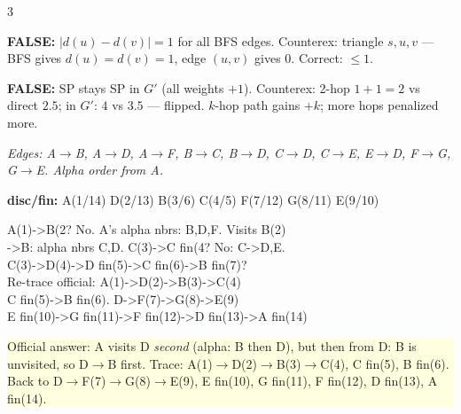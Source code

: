 \documentclass[9pt]{extarticle}
\newcommand{\yb}[1]{\vspace{1pt}\noindent\colorbox{lightyellow}{\parbox{\dimexpr\linewidth-2\fboxsep}{\footnotesize\sffamily #1}}\vspace{1pt}}
\newcommand{\gb}[1]{\vspace{1pt}\noindent\colorbox{lightmint}  {\parbox{\dimexpr\linewidth-2\fboxsep}{\footnotesize\sffamily #1}}\vspace{1pt}}
\newcommand{\rb}[1]{\vspace{1pt}\noindent\colorbox{lightred}   {\parbox{\dimexpr\linewidth-2\fboxsep}{\footnotesize\sffamily #1}}\vspace{1pt}}
\newcommand{\cd}[1]{{\fontsize{7}{8.5}\selectfont\ttfamily\noindent #1}}
\begin{document}
\begin{multicols}{3}
\begin{tcolorbox}[purple,title=Graph T/F Traps]
\rb{\textbf{FALSE:} $|d(u)-d(v)|=1$ for all BFS edges. Counterex: triangle $s,u,v$ --- BFS gives $d(u)=d(v)=1$, edge $(u,v)$ gives 0. Correct: $\leq 1$.}

\rb{\textbf{FALSE:} SP stays SP in $G'$ (all weights $+1$). Counterex: 2-hop $1{+}1{=}2$ vs direct $2.5$; in $G'$: $4$ vs $3.5$ --- flipped. $k$-hop path gains $+k$; more hops penalized more.}
\end{tcolorbox}

\columnbreak

\begin{tcolorbox}[blue,title=Exercise 2a Graph (A--G) --- Official DFS]
\small
\textit{Edges: A$\to$B, A$\to$D, A$\to$F, B$\to$C, B$\to$D, C$\to$D, C$\to$E, E$\to$D, F$\to$G, G$\to$E. Alpha order from A.}
\begin{center}
\end{center}
\gb{\textbf{disc/fin:} A(1/14) D(2/13) B(3/6) C(4/5) F(7/12) G(8/11) E(9/10)}

\cd{A(1)->B(2? No. A's alpha nbrs: B,D,F. Visits B(2)\\
->B: alpha nbrs C,D. C(3)->C fin(4? No: C->D,E.\\
C(3)->D(4)->D fin(5)->C fin(6)->B fin(7)? \\
Re-trace official: A(1)->D(2)->B(3)->C(4)\\
C fin(5)->B fin(6). D->F(7)->G(8)->E(9)\\
E fin(10)->G fin(11)->F fin(12)->D fin(13)->A fin(14)}

\yb{Official answer: A visits D \textit{second} (alpha: B then D), but then from D: B is unvisited, so D$\to$B first. Trace: A(1)$\to$D(2)$\to$B(3)$\to$C(4), C fin(5), B fin(6). Back to D$\to$F(7)$\to$G(8)$\to$E(9), E fin(10), G fin(11), F fin(12), D fin(13), A fin(14).}
\end{tcolorbox}


\end{multicols}
\end{document}
